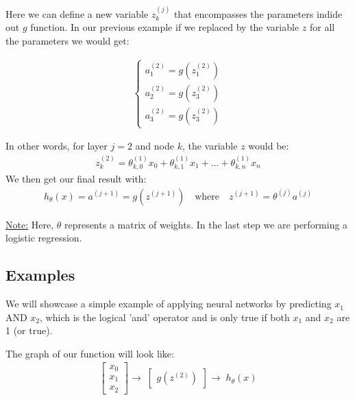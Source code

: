 \documentclass{article}
\begin{document}
        Here we can define a new variable $z_k^{(j)}$ that encompasses the parameters indide out $g$ function. In our
        previous example if we replaced by the variable $z$ for all the parameters we would get:

        \begin{align*}
            \begin{cases}
                a_1^{(2)} = g(z_1^{(2)}) \\
                a_2^{(2)} = g(z_3^{(2)}) \\
                a_3^{(2)} = g(z_3^{(2)})
            \end{cases}
        \end{align*}

        In other words, for layer $j=2$ and node $k$, the variable $z$ would be:
        \begin{align*}
            z_k^{(2)} = \theta_{k,0}^{(1)}x_0 + \theta_{k,1}^{(1)}x_1 + \ldots + \theta_{k,n}^{(1)}x_n
        \end{align*}
        We then get our final result with:
        \begin{align*}
            h_{\theta}(x) = a^{(j+1)} = g(z^{(j+1)}) \quad \text{where} \quad z^{(j+1)} = \theta^{(j)}a^{(j)}
        \end{align*}

        \underline{Note:} Here, $\theta$ represents a matrix of weights. In the last step we are performing a logistic regression.

        \subsection{Examples}

            We will showcase a simple example of applying neural networks by predicting $x_1$ AND $x_2$, which is the logical
            'and' operator and is only true if both $x_1$ and $x_2$ are 1 (or true).

            The graph of our function will look like:
            \begin{align*}
                \begin{bmatrix}
                    x_0 \\
                    x_1 \\
                    x_2
                \end{bmatrix} \longrightarrow \;
                \begin{bmatrix}
                    g(z^{(2)})
                \end{bmatrix} \longrightarrow \; h_{\theta}(x)
            \end{align*}
                
\end{document}
